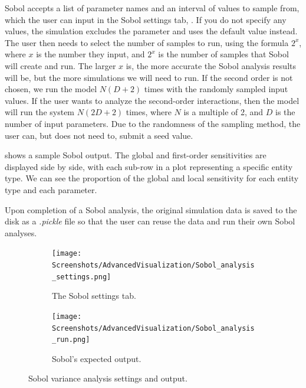 Sobol accepts a list of parameter names and an interval of values to sample from, which the user can input in the Sobol settings tab, . 
If you do not specify any values, the simulation excludes the parameter and uses the default value instead.
The user then needs to select the number of samples to run, using the formula $2^x$, where $x$ is the number they input, and $2^x$ is the number of samples that Sobol will create and run.
The larger $x$ is, the more accurate the Sobol analysis results will be, but the more simulations we will need to run. 
If the second order is not chosen, we run the model $N(D+2)$ times with the randomly sampled input values. 
If the user wants to analyze the second-order interactions, then the model will run the system $N(2D+2)$ times, where $N$ is a multiple of 2, and $D$ is the number of input parameters.
Due to the randomness of the sampling method, the user can, but does not need to, submit a seed value. 

 shows a sample Sobol output. 
The global and first-order sensitivities are displayed side by side, with each sub-row in a plot representing a specific entity type. 
We can see the proportion of the global and local sensitivity for each entity type and each parameter.

Upon completion of a Sobol analysis, the original simulation data is saved to the disk as a \textit{.pickle} file so that the user can reuse the data and run their own Sobol analyses. 

\begin{figure}[h!]
    \centering
    \begin{subfigure}{0.49\linewidth}
        \centering
        \captionsetup{width=1\linewidth}
        \texttt{[image: Screenshots/AdvancedVisualization/Sobol\_analysis\_settings.png]}
        \caption{
            The Sobol settings tab. 
        }
        \label{fig:ss:av:Sobol_analysis_settings}
    \end{subfigure}
    \hfill
    \begin{subfigure}{0.49\linewidth}
        \centering
        \captionsetup{width=1\linewidth}
        \texttt{[image: Screenshots/AdvancedVisualization/Sobol\_analysis\_run.png]}
        \caption{
            Sobol's expected output. 
        }
        \label{fig:ss:av:Sobol_analysis_run}
    \end{subfigure}
    \caption{Sobol variance analysis settings and output. }
\end{figure}

